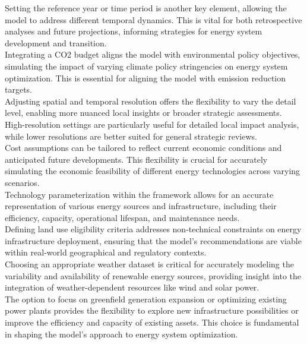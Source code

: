 Setting the reference year or time period is another key element, allowing the model to address different temporal dynamics. This is vital for both retrospective analyses and future projections, informing strategies for energy system development and transition.\\

Integrating a CO2 budget aligns the model with environmental policy objectives, simulating the impact of varying climate policy stringencies on energy system optimization. This is essential for aligning the model with emission reduction targets.\\

Adjusting spatial and temporal resolution offers the flexibility to vary the detail level, enabling more nuanced local insights or broader strategic assessments. High-resolution settings are particularly useful for detailed local impact analysis, while lower resolutions are better suited for general strategic reviews.\\

Cost assumptions can be tailored to reflect current economic conditions and anticipated future developments. This flexibility is crucial for accurately simulating the economic feasibility of different energy technologies across varying scenarios.\\

Technology parameterization within the framework allows for an accurate representation of various energy sources and infrastructure, including their efficiency, capacity, operational lifespan, and maintenance needs.\\

Defining land use eligibility criteria addresses non-technical constraints on energy infrastructure deployment, ensuring that the model's recommendations are viable within real-world geographical and regulatory contexts.\\

Choosing an appropriate weather dataset is critical for accurately modeling the variability and availability of renewable energy sources, providing insight into the integration of weather-dependent resources like wind and solar power.\\

The option to focus on greenfield generation expansion or optimizing existing power plants provides the flexibility to explore new infrastructure possibilities or improve the efficiency and capacity of existing assets. This choice is fundamental in shaping the model's approach to energy system optimization.\\

